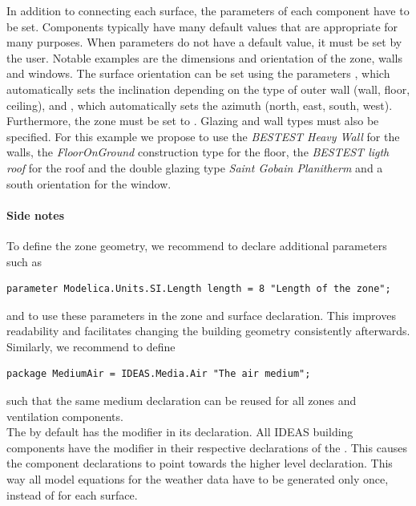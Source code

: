 \documentclass[10pt,a4paper]{article}
\begin{document}
In addition to connecting each surface, the parameters of each component have to be set. 
Components typically have many default values that are appropriate for many purposes.
When parameters do not have a default value, it must be set by the user. 
Notable examples are the dimensions and orientation of the zone, walls and windows. 
The surface orientation can be set using the parameters , which automatically sets the inclination depending on the type of outer wall (wall, floor, ceiling), and , which automatically sets the azimuth (north, east, south, west).
Furthermore, the zone  must be set to .
Glazing and wall types must also be specified.
For this example we propose to use the \textit{BESTEST Heavy Wall} for the walls, the \textit{FloorOnGround} construction type for the floor, the \textit{BESTEST ligth roof} for the roof
and the double glazing type \textit{Saint Gobain Planitherm} and a south orientation for the window.

\paragraph{Side notes}
To define the zone geometry, 
we recommend to declare additional parameters such as
\begin{verbatim}
parameter Modelica.Units.SI.Length length = 8 "Length of the zone";
\end{verbatim}
and to use these parameters in the zone and surface declaration. 
This improves readability and facilitates changing the building geometry consistently afterwards.\\

Similarly, we recommend to define
\begin{verbatim}
package MediumAir = IDEAS.Media.Air "The air medium";
\end{verbatim}
such that the same medium declaration can be reused for all zones and ventilation components.\\

The  by default has the modifier  in its declaration. 
All IDEAS building components have the modifier  in their respective 
declarations of the . 
This causes the component declarations to point towards the higher level 
declaration. This way all model equations for the weather data have to be generated only once,
instead of for each surface.

\newpage
\end{document}
